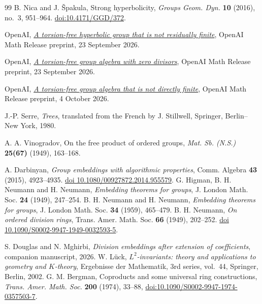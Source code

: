 \documentclass[11pt,a4paper]{article}
\numberwithin{equation}{section}
\begin{document}
\begin{thebibliography}{99}
B. Nica and J. \v{S}pakula, Strong hyperbolicity, \emph{Groups Geom. Dyn.}
\textbf{10} (2016), no.~3, 951--964.
\href{https://doi.org/10.4171/GGD/372}{doi:10.4171/GGD/372}.

OpenAI,
\href{https://github.com/openai/math/tree/main/preprints/a-torsion-free-hyperbolic-group-that-is-not-residually-finite-September-23-2026}{\emph{A torsion-free hyperbolic group that is not residually finite}},
OpenAI Math Release preprint, 23 September 2026.

OpenAI,
\href{https://github.com/openai/math/blob/main/preprints/A-Torsion-Free-Group-Algebra-with-Zero-Divisors-September-23-2026/paper.pdf}{\emph{A torsion-free group algebra with zero divisors}},
OpenAI Math Release preprint, 23 September 2026.

OpenAI,
\href{https://github.com/openai/math/blob/main/preprints/A-Torsion-Free-Group-Algebra-That-Is-Not-Directly-Finite-October-4-2026/direct-finiteness.pdf}{\emph{A torsion-free group algebra that is not directly finite}},
OpenAI Math Release preprint, 4 October 2026.

J.-P. Serre, \emph{Trees}, translated from the French by J. Stillwell,
Springer, Berlin--New York, 1980.

A. A. Vinogradov, On the free product of ordered groups, \emph{Mat. Sb. (N.S.)}
\textbf{25(67)} (1949), 163--168.

A. Darbinyan, \emph{Group embeddings with algorithmic properties}, Comm. Algebra \textbf{43} (2015), 4923--4935. \href{https://doi.org/10.1080/00927872.2014.955579}{doi 10.1080/00927872.2014.955579}.
G. Higman, B. H. Neumann and H. Neumann, \emph{Embedding theorems for groups}, J. London Math. Soc. \textbf{24} (1949), 247--254.
B. H. Neumann and H. Neumann, \emph{Embedding theorems for groups}, J. London Math. Soc. \textbf{34} (1959), 465--479.
B. H. Neumann, \emph{On ordered division rings}, Trans. Amer. Math. Soc. \textbf{66} (1949), 202--252. \href{https://doi.org/10.1090/S0002-9947-1949-0032593-5}{doi 10.1090/S0002-9947-1949-0032593-5}.

S. Douglas and N. Mghirbi, \emph{Division embeddings after extension of coefficients},
companion manuscript, 2026.
W. L\"uck, \emph{\(L^2\)-invariants: theory and applications to geometry and \(K\)-theory},
Ergebnisse der Mathematik, 3rd series, vol.~44, Springer, Berlin, 2002.
G. M. Bergman, Coproducts and some universal ring constructions, \emph{Trans. Amer. Math. Soc.} \textbf{200} (1974),
33--88, \href{https://doi.org/10.1090/S0002-9947-1974-0357503-7}{doi:10.1090/S0002-9947-1974-0357503-7}.

\end{thebibliography}
\end{document}
